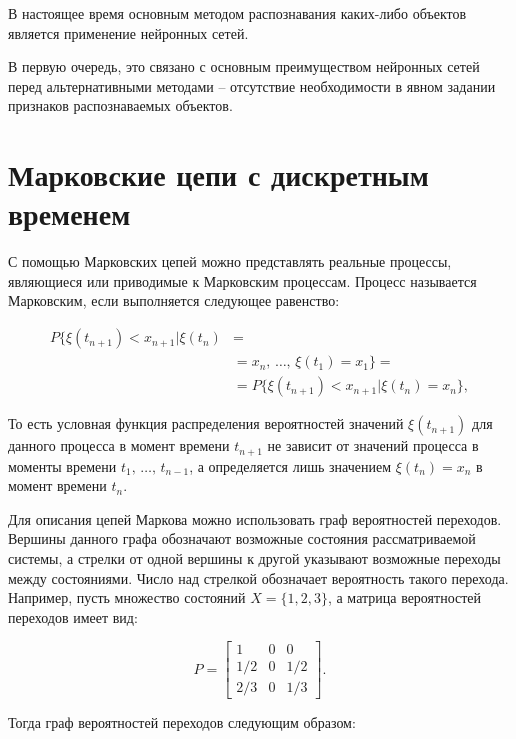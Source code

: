 В настоящее время основным методом распознавания каких-либо объектов является применение нейронных сетей.

В первую очередь, это связано с основным преимуществом нейронных сетей перед альтернативными методами -- отсутствие необходимости в явном задании признаков распознаваемых объектов.

\section{Марковские цепи с дискретным временем}

С помощью Марковских цепей можно представлять реальные процессы, являющиеся или приводимые к Марковским процессам. Процесс называется Марковским, если выполняется следующее равенство:

\begin{equation}
    \begin{split}
    P\{\xi(t_{n+1}) < x_{n+1}|\xi(t_{n}) &= \\ &= x_{n},\,\dots,\,\xi(t_{1}) = x_{1}\} = \\ &= P\{\xi(t_{n+1}) < x_{n+1}|\xi(t_{n}) = x_{n}\},
    \end{split}
\end{equation}

То есть условная функция распределения вероятностей значений $\xi(t_{n+1})$ для данного процесса в момент времени $t_{n+1}$ не зависит от значений процесса в
моменты времени $t_1,\,\dots,\,t_{n-1}$, а определяется лишь значением $\xi(t_{n})=x_n$ в момент времени $t_n$.

Для описания цепей Маркова можно использовать граф вероятностей
переходов. Вершины данного графа обозначают возможные состояния рассматриваемой системы, а стрелки от одной вершины к другой указывают возможные переходы
между состояниями. Число над стрелкой обозначает вероятность такого перехода. Например, пусть множество состояний $X=\{1,2,3\}$, а матрица вероятностей переходов имеет вид:

\begin{equation}
  P =
  \begin{bmatrix}
    1 & 0 & 0     \\
    1/2 & 0 & 1/2 \\
    2/3 & 0 & 1/3
  \end{bmatrix}.
\end{equation}

Тогда граф вероятностей переходов следующим образом:



